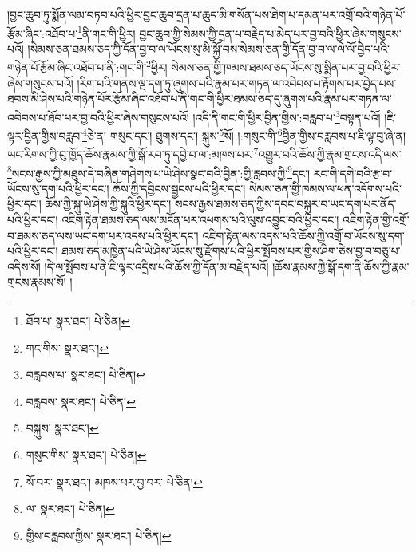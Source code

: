 །བྱང་ཆུབ་ཏུ་སྨོན་ལམ་བཏབ་པའི་ཕྱིར་བྱང་ཆུབ་དྲན་པ་ཆུད་མི་གསོན་པས་ཐེག་པ་དམན་པར་འགྲོ་བའི་གཉེན་པོ་རྩོམ་ཞིང་:འཐོབ་པ་\footnote{ཐོབ་པ་  སྣར་ཐང་།  པེ་ཅིན། }ནི་གང་གི་ཕྱིར། བྱང་ཆུབ་ཀྱི་སེམས་ཀྱི་དྲན་པ་བརྗེད་པ་མེད་པར་བྱ་བའི་ཕྱིར་ཞེས་གསུངས་པའོ། །སེམས་ཅན་ཐམས་ཅད་ཀྱི་དོན་བྱ་བ་ལ་ཡོངས་སུ་མི་སྐྱོ་བས་སེམས་ཅན་གྱི་དོན་བྱ་བ་ལ་ལེ་ལོ་བྱེད་པའི་གཉེན་པོ་རྩོམ་ཞིང་འཐོབ་པ་ནི་:གང་གི་\footnote{གང་གིས་  སྣར་ཐང་། }ཕྱིར། སེམས་ཅན་གྱི་ཁམས་ཐམས་ཅད་ཡོངས་སུ་སྨིན་པར་བྱ་བའི་ཕྱིར་ཞེས་གསུངས་པའོ། །རིག་པའི་གནས་ལྔ་དག་ཏུ་ཞུགས་པའི་རྣམ་པར་གཏན་ལ་འབེབས་པ་རྟོགས་པར་བྱེད་པས་ཐབས་མི་ཤེས་པའི་གཉེན་པོར་རྩོམ་ཞིང་འཐོབ་པ་ནི་གང་གི་ཕྱིར་ཐམས་ཅད་དུ་ཞུགས་པའི་རྣམ་པར་གཏན་ལ་འབེབས་པ་ཐོབ་པར་བྱ་བའི་ཕྱིར་ཞེས་གསུངས་པའོ། །འདི་ནི་གང་གི་ཕྱིར་བྱིན་གྱིས་:བརླབ་པ་\footnote{བརླབས་པ་  སྣར་ཐང་།  པེ་ཅིན། }བསྟན་པའོ། །ཇི་ལྟར་བྱིན་གྱིས་བརླབ་\footnote{བརླབས་  སྣར་ཐང་།  པེ་ཅིན། }ཅེ་ན། གསུང་དང་། ཐུགས་དང་། སྐུས་\footnote{བསྐུས་  སྣར་ཐང་། }སོ། །:གསུང་གི་\footnote{གསུང་གིས་  སྣར་ཐང་།  པེ་ཅིན། }བྱིན་གྱིས་བརླབས་པ་ཇི་ལྟ་བུ་ཞེ་ན། ཡང་རིགས་ཀྱི་བུ་ཁྱོད་ཆོས་རྣམས་ཀྱི་སྒོ་རབ་ཏུ་དབྱེ་བ་ལ་:མཁས་པར་\footnote{སོ་བར་  སྣར་ཐང་། མཁས་པར་བྱ་བར་  པེ་ཅིན། }འགྱུར་བའི་ཆོས་ཀྱི་རྣམ་གྲངས་འདི་ལས་\footnote{ལ་  སྣར་ཐང་།  པེ་ཅིན། }སངས་རྒྱས་ཀྱི་མཐུས་དེ་བཞིན་གཤེགས་པ་ཡེ་ཤེས་སྣང་བའི་བྱིན་:གྱི་རླབས་ཀྱི་\footnote{གྱིས་བརླབས་ཀྱིས་  སྣར་ཐང་།  པེ་ཅིན། }དང་། རང་གི་དགེ་བའི་རྩ་བ་ཡོངས་སུ་དག་པའི་ཕྱིར་དང་། ཆོས་ཀྱི་དབྱིངས་སྦྱངས་པའི་ཕྱིར་དང་། སེམས་ཅན་གྱི་ཁམས་ལ་ཕན་འདོགས་པའི་ཕྱིར་དང་། ཆོས་ཀྱི་སྐུ་ཡེ་ཤེས་ཀྱི་སྐུའི་ཕྱིར་དང་། སངས་རྒྱས་ཐམས་ཅད་ཀྱིས་དབང་བསྐུར་བ་ཡང་དག་པར་ནོད་པའི་ཕྱིར་དང་། འཇིག་རྟེན་ཐམས་ཅད་ལས་མངོན་པར་འཕགས་པའི་ལུས་འབྱུང་བའི་ཕྱིར་དང་། འཇིག་རྟེན་གྱི་འགྲོ་བ་ཐམས་ཅད་ལས་ཡང་དག་པར་འདས་པའི་ཕྱིར་དང་། འཇིག་རྟེན་ལས་འདས་པའི་ཆོས་ཀྱི་འགྲོ་བ་ཡོངས་སུ་དག་པའི་ཕྱིར་དང་། ཐམས་ཅད་མཁྱེན་པའི་ཡེ་ཤེས་ཡོངས་སུ་རྫོགས་པའི་ཕྱིར་སྤོབས་པར་གྱིས་ཤིག་ཅེས་བྱ་བ་བཅུ་པ་འདིས་སོ། །དེ་ལ་སྤོབས་པ་ནི་ཇི་ལྟར་འདྲིས་པའི་ཆོས་ཀྱི་དོན་མ་བརྗེད་པའོ། །ཆོས་རྣམས་ཀྱི་སྒོ་དག་ནི་ཆོས་ཀྱི་རྣམ་གྲངས་རྣམས་སོ། །
